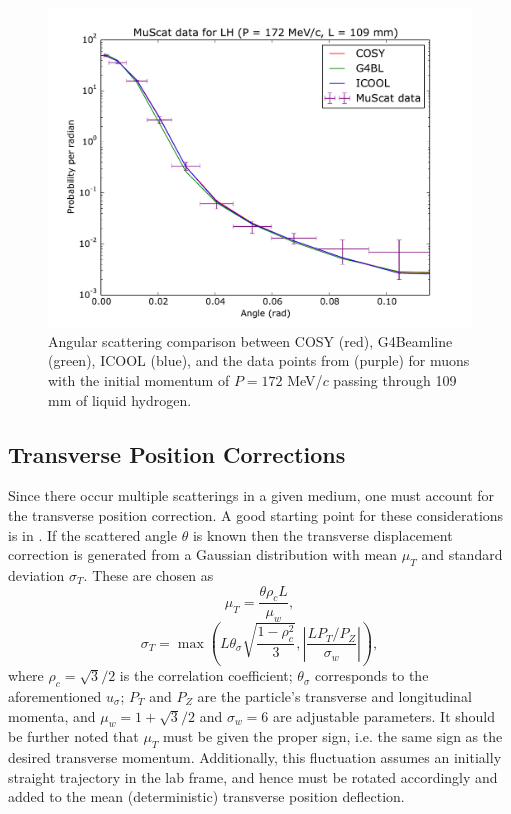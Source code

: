 \documentclass{jacow}
\begin{document}
\begin{figure}[htbf]
\centering
\includegraphics[width=\columnwidth]{Figures/scattering.pdf}
\caption{Angular scattering comparison between COSY (red), G4Beamline (green), ICOOL (blue), and the data points from \cite{Muscat} (purple) for muons with the initial momentum of $P=172$ MeV/$c$ passing through 109 mm of liquid hydrogen.}
\label{fig:scattering}
\end{figure}

\subsection{Transverse Position Corrections}
Since there occur multiple scatterings in a given medium, one must account for the transverse position correction. A good starting point for these considerations is in \cite{PDG}. If the scattered angle $\theta$ is known then the transverse displacement correction is generated from a Gaussian distribution with mean $\mu_T$ and standard deviation $\sigma_T$. These are chosen as 
\[
\mu_T = \frac{\theta \rho_c L}{\mu_w},
\]
\[
\sigma_T = \max\left(L \theta_\sigma \sqrt{\frac{1-\rho_c^2}{3}},\left|\frac{L P_T / P_Z}{\sigma_w}\right|\right),
\]
where $\rho_c = \sqrt{3}/2$ is the correlation coefficient; $\theta_\sigma$ corresponds to the aforementioned $u_\sigma$; $P_T$ and $P_Z$ are the particle's transverse and longitudinal momenta, and $\mu_w=1+\sqrt{3}/2$ and $\sigma_w=6$ are adjustable parameters. It should be further noted that $\mu_T$ must be given the proper sign, i.e. the same sign as the desired transverse momentum. Additionally, this fluctuation assumes an initially straight trajectory in the lab frame, and hence must be rotated accordingly and added to the mean (deterministic) transverse position deflection.
\end{document}
